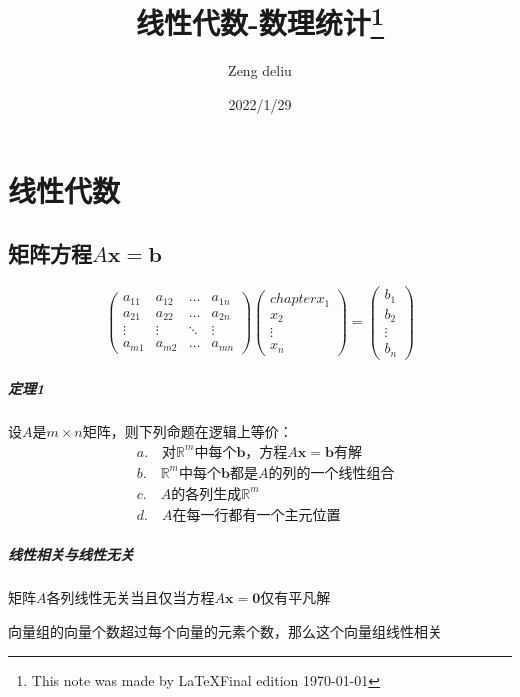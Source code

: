 \documentclass[12pt]{report}
\begin{document}
\title{线性代数-数理统计\thanks{This note was made by \LaTeX \quad Final edition \today}}
\date{2022/1/29}
\author{Zeng deliu}
\maketitle
\tableofcontents{}
\chapter{线性代数}
\section{矩阵方程\texorpdfstring{$A\mathbf{x}=\mathbf{b}$}{}}
$$\left(\begin{matrix}
    a_{11} &a_{12} &\dots &a_{1n}\\
    a_{21} &a_{22} &\dots &a_{2n}\\
    \vdots &\vdots &\ddots&\vdots\\
    a_{m1} &a_{m2} &\dots &a_{mn}
\end{matrix}\right)
\left(\begin{matrix}chapter
    x_1\\x_2\\\vdots \\x_n
\end{matrix}\right)
=\left(\begin{matrix}
    b_1\\b_2\\\vdots \\b_n
\end{matrix}\right)$$
\paragraph{定理1}
    设$A$是$m\times n$矩阵，则下列命题在逻辑上等价：
    \begin{align*}
        &a.\quad\mbox{对$\mathbb{R} ^m$中每个$\boldsymbol{b}$，方程$A\boldsymbol{x}=\boldsymbol{b}$有解}\\
        &b.\quad\mbox{$\mathbb{R} ^m$中每个$\boldsymbol{b}$都是$A$的列的一个线性组合}\\
        &c.\quad\mbox{$A$的各列生成$\mathbb{R} ^m$}\\
        &d.\quad\mbox{$A$在每一行都有一个主元位置}
    \end{align*}
\paragraph{线性相关与线性无关}
    矩阵$A$各列线性无关当且仅当方程$A\boldsymbol{x}=\boldsymbol{0}$仅有平凡解\par
    向量组的向量个数超过每个向量的元素个数，那么这个向量组线性相关
\end{document}
